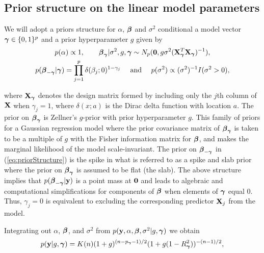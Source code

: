 \subsection{Prior structure on the linear model parameters} 

We will adopt a priors structure for $\alpha$, ${\boldsymbol \beta}$ and $\sigma^2$ conditional
a model  vector ${\boldsymbol \gamma}\in \{0, 1\}^p$ and a prior hyperparameter $g$  given by
\begin{equation}
\label{eq:priorStructure}
\begin{array}{c}
\displaystyle p(\alpha) \propto 1,  
\qquad 
{\boldsymbol\beta}_{\boldsymbol \gamma} | \sigma^2, g, {\boldsymbol \gamma} \sim N_p({\bf 0}, g \sigma^2 ({\bf X}_{\boldsymbol \gamma}^T {\bf X}_{\boldsymbol \gamma})^{-1}), \\[1ex]
\displaystyle p({\boldsymbol \beta}_{-{\boldsymbol \gamma}}|{\boldsymbol \gamma}) = \prod_{j=1}^p \delta(\beta_j;0)^{1-\gamma_j}
\quad \text{ and }  \quad 
\displaystyle p(\sigma^2) \propto (\sigma^2)^{-1} I(\sigma^2 > 0),                      
\end{array}
\end{equation} 

\noindent where ${\bf X}_{\boldsymbol \gamma}$ denotes the design matrix formed by including only the 
$j$th column of ${\bf X}$ when $\gamma_j = 1$,
where $\delta(x;a)$ is the Dirac delta function with location $a$.  
The prior on ${\boldsymbol \beta}_{\boldsymbol \gamma}$ is Zellner's $g$-prior \citep[see for example,][]{Zellner1986} with prior 
hyperparameter $g$. This family of priors for a Gaussian regression model where the prior covariance 
matrix of ${\boldsymbol \beta}_{\boldsymbol \gamma}$ is taken to be a multiple of $g$ with the Fisher information matrix for ${\boldsymbol \beta}$, and makes the marginal likelihood of the model scale-invariant.
The prior on ${\boldsymbol \beta}_{-{\boldsymbol \gamma}}$ in (\ref{eq:priorStructure}) is the spike in
what is referred to as a spike and slab prior where the prior on ${\boldsymbol \beta}_{{\boldsymbol \gamma}}$ is assumed to be flat (the slab). 
The above structure implies 
that $p({\boldsymbol \beta}_{-{\boldsymbol \gamma}}|{\bf y})$ is a point mass at ${\bf 0}$
and leads to
algebraic and computational simplifications for components of ${\boldsymbol \beta}$ when elements of ${\boldsymbol \gamma}$ equal 0.
Thus, $\gamma_j=0$ is equivalent to excluding the corresponding predictor ${\bf X}_j$ from the model.

Integrating out $\alpha$, ${\boldsymbol \beta}$, and $\sigma^2$ from $p({\bf y},\alpha,{\boldsymbol \beta},\sigma^2|g,{\boldsymbol \gamma})$ we
obtain
\begin{equation}\label{eq:yGivenG}
\begin{array}{rl}
\displaystyle p({\bf y}|g,{\boldsymbol \gamma})
\displaystyle = K(n)
(1 + g)^{(n - p_{\boldsymbol \gamma} - 1)/2}(1 + g (1 - R_{\boldsymbol \gamma}^2))^{-(n-1)/2},
\end{array} 
\end{equation}


